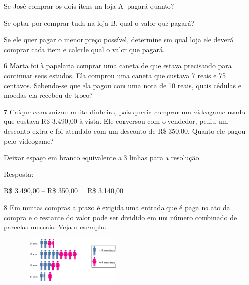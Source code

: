 \begin{escolha}
{\begin{escolha}

\item
  Se José comprar os dois itens na loja A, pagará quanto?

\item
  Se optar por comprar tuda na loja B, qual o valor que pagará?

\item
  Se ele quer pagar o menor preço possível, determine em qual loja ele
  deverá comprar cada item e calcule qual o valor que pagará.
\end{escolha}

\num{6} Marta foi à papelaria comprar uma caneta de que estava precisando para
continuar seus estudos. Ela comprou uma caneta que custava 7 reais e 75
centavos. Sabendo-se que ela pagou com uma nota de 10 reais, quais
cédulas e moedas ela recebeu de troco?


\num{7} Caíque economizou muito dinheiro, pois queria comprar um videogame usado
que custava R\$ 3.490,00 à vista. Ele conversou com o vendedor, pediu
um desconto extra e foi atendido com um desconto de R\$ 350,00. Quanto ele pagou pelo videogame?

Deixar espaço em branco equivalente a 3 linhas para a resolução

Resposta:

R\$ 3.490,00 -- R\$ 350,00 = R\$ 3.140,00

\num{8} Em muitas compras a prazo é exigida uma entrada que é paga no ato da
compra e o restante do valor pode ser dividido em um número combinado de
parcelas mensais. Veja o exemplo.

\includegraphics[width=2.90025in,height=0.89174in]{media/image76.png}

}
\end{escolha}

